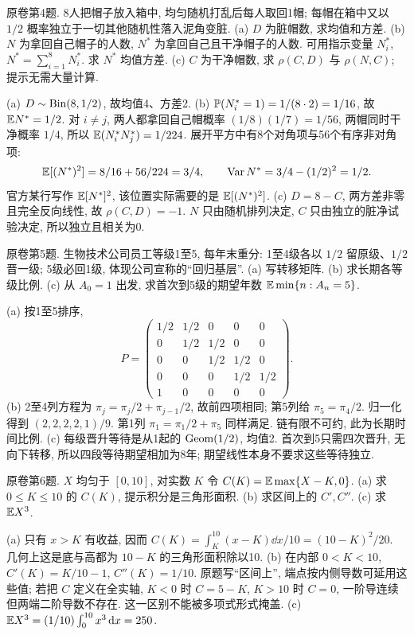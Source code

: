 \begin{exercise}\label{ex:fl19-4}
原卷第4题. 8人把帽子放入箱中, 均匀随机打乱后每人取回1帽; 每帽在箱中又以 $1/2$ 概率独立于一切其他随机性落入泥角变脏. (a) $D$ 为脏帽数, 求均值和方差. (b) $N$ 为拿回自己帽子的人数, $N^*$ 为拿回自己且干净帽子的人数. 可用指示变量 $N_i^*$, $N^*=\sum_{i=1}^8N_i^*$. 求 $N^*$ 均值方差. (c) $C$ 为干净帽数, 求 $\rho(C,D)$ 与 $\rho(N,C)$; 提示无需大量计算.
\end{exercise}
\begin{solution}
(a)\label{sol:fl19-4-a} $D\sim\operatorname{Bin}(8,1/2)$, 故均值4、方差2.
(b)\label{sol:fl19-4-b} $\mathbb P(N_i^*=1)=1/(8\cdot2)=1/16$, 故 $\mathbb E N^*=1/2$. 对 $i\ne j$, 两人都拿回自己帽概率 $(1/8)(1/7)=1/56$, 两帽同时干净概率 $1/4$, 所以 $\mathbb E(N_i^*N_j^*)=1/224$. 展开平方中有8个对角项与56个有序非对角项:
\[\mathbb E[(N^*)^2]=8/16+56/224=3/4,\qquad\operatorname{Var} N^*=3/4-(1/2)^2=1/2.\]
官方某行写作 $\mathbb E[N^*]^2$, 该位置实际需要的是 $\mathbb E[(N^*)^2]$.
(c)\label{sol:fl19-4-c} $D=8-C$, 两方差非零且完全反向线性, 故 $\rho(C,D)=-1$. $N$ 只由随机排列决定, $C$ 只由独立的脏净试验决定, 所以独立且相关为0.
\end{solution}

\begin{exercise}\label{ex:fl19-5}
原卷第5题. 生物技术公司员工等级1至5, 每年末重分: 1至4级各以 $1/2$ 留原级、$1/2$ 晋一级; 5级必回1级, 体现公司宣称的``回归基层''. (a) 写转移矩阵. (b) 求长期各等级比例. (c) 从 $A_0=1$ 出发, 求首次到5级的期望年数 $\mathbb E\min\{n:A_n=5\}$.
\end{exercise}
\begin{solution}
(a)\label{sol:fl19-5-a} 按1至5排序,
\[P=\begin{pmatrix}1/2&1/2&0&0&0\\0&1/2&1/2&0&0\\0&0&1/2&1/2&0\\0&0&0&1/2&1/2\\1&0&0&0&0\end{pmatrix}.\]
(b)\label{sol:fl19-5-b} 2至4列方程为 $\pi_j=\pi_j/2+\pi_{j-1}/2$, 故前四项相同; 第5列给 $\pi_5=\pi_4/2$. 归一化得到 $(2,2,2,2,1)/9$. 第1列 $\pi_1=\pi_1/2+\pi_5$ 同样满足. 链有限不可约, 此为长期时间比例.
(c)\label{sol:fl19-5-c} 每级晋升等待是从1起的 $\operatorname{Geom}(1/2)$, 均值2. 首次到5只需四次晋升, 无向下转移, 所以四段等待期望相加为8年; 期望线性本身不要求这些等待独立.
\end{solution}

\begin{exercise}\label{ex:fl19-6}
原卷第6题. $X$ 均匀于 $[0,10]$, 对实数 $K$ 令 $C(K)=\mathbb E\max\{X-K,0\}$. (a) 求 $0\leq K\leq10$ 的 $C(K)$, 提示积分是三角形面积. (b) 求区间上的 $C',C''$. (c) 求 $\mathbb E X^3$.
\end{exercise}
\begin{solution}
(a)\label{sol:fl19-6-a} 只有 $x>K$ 有收益, 因而 $C(K)=\int_K^{10}(x-K)\dd x/10=(10-K)^2/20$. 几何上这是底与高都为 $10-K$ 的三角形面积除以10.
(b)\label{sol:fl19-6-b} 在内部 $0<K<10$, $C'(K)=K/10-1$, $C''(K)=1/10$. 原题写``区间上'', 端点按内侧导数可延用这些值; 若把 $C$ 定义在全实轴, $K<0$ 时 $C=5-K$, $K>10$ 时 $C=0$, 一阶导连续但两端二阶导数不存在. 这一区别不能被多项式形式掩盖.
(c)\label{sol:fl19-6-c} $\mathbb E X^3=(1/10)\int_0^{10}x^3\,\mathrm d x=250$.
\end{solution}

